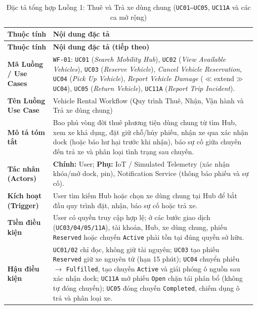 {\small
\begin{longtable}{>{\raggedright\arraybackslash\bfseries}p{3.5cm} >{\raggedright\arraybackslash}p{\dimexpr\textwidth-3.5cm-4\tabcolsep\relax}}
\caption{Đặc tả tổng hợp Luồng 1: Thuê và Trả xe dùng chung (\texttt{UC01--UC05}, \texttt{UC11A} và các ca mở rộng)} \label{tab:wf-rental} \\
\toprule
Thuộc tính & \textbf{Nội dung đặc tả} \\
\midrule
\endfirsthead
\toprule
Thuộc tính & \textbf{Nội dung đặc tả (tiếp theo)} \\
\midrule
\endhead
\bottomrule
\endfoot
Mã Luồng / Use Cases & \texttt{WF-01}: \texttt{UC01} (\textit{Search Mobility Hub}), \texttt{UC02} (\textit{View Available Vehicles}), \texttt{UC03} (\textit{Reserve Vehicle}), \textit{Cancel Vehicle Reservation}, \texttt{UC04} (\textit{Pick Up Vehicle}), \textit{Report Vehicle Damage} ($\ll$extend$\gg$ \texttt{UC04}), \texttt{UC05} (\textit{Return Vehicle}), \texttt{UC11A} (\textit{Report Trip Incident}). \\
Tên Luồng Use Case & Vehicle Rental Workflow (Quy trình Thuê, Nhận, Vận hành và Trả xe dùng chung) \\
Mô tả tóm tắt & Bao phủ vòng đời thuê phương tiện dùng chung từ tìm Hub, xem xe khả dụng, đặt giữ chỗ/hủy phiếu, nhận xe qua xác nhận dock (hoặc báo hư hại trước khi nhận), báo sự cố giữa chuyến đến trả xe và phân loại tình trạng sau chuyến. \\
Tác nhân (Actors) & \textbf{Chính:} User; \textbf{Phụ:} IoT / Simulated Telemetry (xác nhận khóa/mở dock, pin), Notification Service (thông báo phiếu và sự cố). \\
Kích hoạt (Trigger) & User tìm kiếm Hub hoặc chọn xe dùng chung tại Hub để bắt đầu quy trình đặt, nhận, báo sự cố hoặc trả xe. \\
Tiền điều kiện & User có quyền truy cập hợp lệ; ở các bước giao dịch (\texttt{UC03/04/05/11A}), tài khoản, Hub, xe dùng chung, phiếu \texttt{Reserved} hoặc chuyến \texttt{Active} phải tồn tại đúng quyền sở hữu. \\
Hậu điều kiện & \texttt{UC01/02} chỉ đọc, không giữ tài nguyên; \texttt{UC03} tạo phiếu \texttt{Reserved} giữ xe nguyên tử (hạn 15 phút); \texttt{UC04} chuyển phiếu $\rightarrow$ \texttt{Fulfilled}, tạo chuyến \texttt{Active} và giải phóng ô nguồn sau xác nhận dock; \texttt{UC11A} mở phiếu \texttt{Open} chặn tái phân bổ (không tự đóng chuyến); \texttt{UC05} đóng chuyến \texttt{Completed}, chiếm dụng ô trả và phân loại xe. \\

\end{longtable}}
